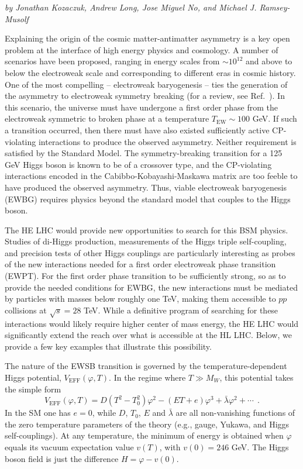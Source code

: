 \begin{center}
\textit{by Jonathan Kozaczuk, Andrew Long, Jose Miguel No, and Michael J. Ramsey-Musolf}
\end{center}

 Explaining the origin of the cosmic matter-antimatter asymmetry is a key open problem at the interface of high energy physics and cosmology. A number of scenarios have been proposed, ranging in energy scales from $\sim 10^{12}$ and above to below the electroweak scale and corresponding to different eras in cosmic history. One of the most compelling -- electroweak baryogenesis --  ties the generation of the asymmetry to electroweak symmetry breaking (for a review, see Ref.~\cite{Morrissey:2012db}). In this scenario, the universe must have undergone a first order phase from the electroweak symmetric to broken phase at a temperature $T_\mathrm{EW} \sim 100$ GeV. If such a transition occurred, then there must have also existed sufficiently active CP-violating interactions to produce the observed asymmetry. Neither requirement is satisfied by the Standard Model. The symmetry-breaking transition for a 125 GeV Higgs boson is known to be of a crossover type, and the CP-violating interactions encoded in the Cabibbo-Kobayashi-Maskawa matrix are too feeble to have produced the observed asymmetry. Thus, viable electroweak baryogenesis (EWBG) requires physics beyond the standard model that couples to the Higgs boson.

The HE LHC would provide new opportunities to search for this BSM physics. Studies of di-Higgs production, measurements of the Higgs triple self-coupling, and precision tests of other Higgs couplings are particularly interesting as probes of the new interactions needed for a first order electroweak phase transition (EWPT). For the first order phase transition to be sufficiently strong, so as to provide the needed conditions for EWBG, the new interactions must be mediated by particles with masses below roughly one TeV, making them accessible to $pp$ collisions at $\sqrt{s} = 28$ TeV. While a definitive program of searching for these interactions would likely require higher center of mass energy, the HE LHC would significantly extend the reach over what is accessible at the HL LHC. Below, we provide a few key examples that illustrate this possibility.

 The nature of the EWSB transition is governed by the temperature-dependent Higgs potential, $V_\mathrm{EFF}(\varphi, T)$. In the regime where $T\gg M_W$, this potential takes the 
simple form
\begin{equation}
V_\mathrm{EFF}(\varphi,T) = D(T^2-T_0^2)\varphi^2 -(ET+e)\varphi^3 + {\bar\lambda}\varphi^2+\cdots ~~.
\label{eq:HiggspotT}
\end{equation}
In the SM one has $e=0$, while $D$, $T_0$, $E$ and ${\bar\lambda}$ are all non-vanishing functions of the zero temperature parameters of the theory (e.g., gauge, Yukawa, and Higgs self-couplings). At any temperature, the minimum of energy is obtained when $\varphi$ equals its vacuum expectation value $v(T)$, with $v(0) = 246$ GeV. The Higgs boson field is just the difference $H=\varphi-v(0)$. 

